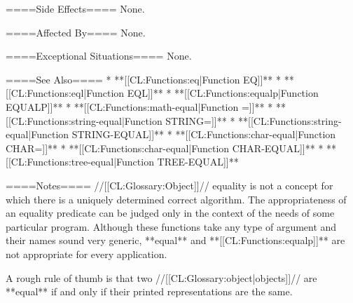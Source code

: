 ====Side Effects====
None.

====Affected By====
None.

====Exceptional Situations====
None.

====See Also====
  * **[[CL:Functions:eq|Function EQ]]**
  * **[[CL:Functions:eql|Function EQL]]**
  * **[[CL:Functions:equalp|Function EQUALP]]**
  * **[[CL:Functions:math-equal|Function =]]**
  * **[[CL:Functions:string-equal|Function STRING=]]**
  * **[[CL:Functions:string-equal|Function STRING-EQUAL]]**
  * **[[CL:Functions:char-equal|Function CHAR=]]**
  * **[[CL:Functions:char-equal|Function CHAR-EQUAL]]**
  * **[[CL:Functions:tree-equal|Function TREE-EQUAL]]**

====Notes====
//[[CL:Glossary:Object]]// equality is not a concept for which there is a uniquely determined correct algorithm. The appropriateness of an equality predicate can be judged only in the context of the needs of some particular program. Although these functions take any type of argument and their names sound very generic, **equal** and **[[CL:Functions:equalp]]** are not appropriate for every application.

A rough rule of thumb is that two //[[CL:Glossary:object|objects]]// are **equal** if and only if their printed representations are the same.

  
